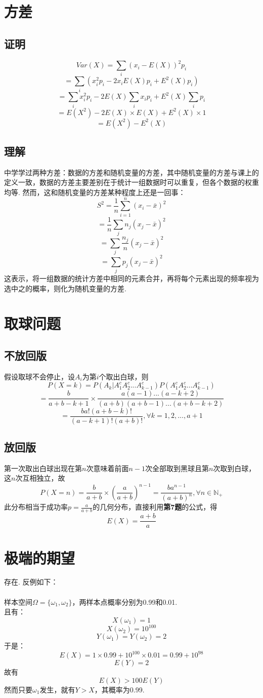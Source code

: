 \documentclass{article}
\begin{document}
\begin{CJK}{UTF8}{gbsn}
\section{方差}
\subsection{证明}
$$ Var(X)=\sum\limits_{i}(x_{i}-E(X))^{2}p_{i}$$
$$ =\sum\limits_{i}(x_{i}^{2}p_{i}-2x_{i}E(X)p_{i}+E^{2}(X)p_{i}) $$
$$ =\sum\limits_{i}x_{i}^{2}p_{i}-2E(X)\sum\limits_{i}x_{i}p_{i}+E^{2}(X)\sum\limits_{i}p_{i} $$
$$ =E(X^{2})-2E(X)\times E(X)+E^{2}(X)\times 1 $$
$$ =E(X^{2})-E^{2}(X) $$
\subsection{理解}
中学学过两种方差：数据的方差和随机变量的方差，其中随机变量的方差与课上的定义一致，数据的方差主要差别在于统计一组数据时可以重复，但各个数据的权重均等. 然而，这和随机变量的方差某种程度上还是一回事：
$$ S^{2}=\frac{1}{n}\sum\limits_{i=1}^{n}(x_{i}-\bar{x})^{2} $$
$$ =\frac{1}{n}\sum\limits_{j}n_{j}(x_{j}-\bar{x})^{2} $$
$$ =\sum\limits_{j}\frac{n_{j}}{n}(x_{j}-\bar{x})^{2} $$
$$ =\sum\limits_{j}p_{j}(x_{j}-\bar{x})^{2} $$
这表示，将一组数据的统计方差中相同的元素合并，再将每个元素出现的频率视为选中之的概率，则化为随机变量的方差.
\section{取球问题}
\subsection{不放回版}
假设取球不会停止，设$A_{i}$为第$i$个取出白球，则\\
$$P(X=k)=P(A_{k}|A_{1}^{c}A_{2}^{c}...A_{k-1}^{c})P(A_{1}^{c}A_{2}^{c}...A_{k-1}^{c})$$
$$=\frac{b}{a+b-k+1}\times\frac{a(a-1)...(a-k+2)}{(a+b)(a+b-1)...(a+b-k+2)}$$
$$=\frac{ba!(a+b-k)!}{(a-k+1)!(a+b)!},\forall k=1,2,...,a+1$$
\subsection{放回版}
第一次取出白球出现在第$n$次意味着前面$n-1$次全部取到黑球且第$n$次取到白球，这$n$次互相独立，故
$$P(X=n)=\frac{b}{a+b}\times(\frac{a}{a+b})^{n-1}=\frac{ba^{n-1}}{(a+b)^{n}},\forall n\in\mathbb{N}_{+} $$
此分布相当于成功率$p=\frac{a}{a+b}$的几何分布，直接利用\textbf{第7题}的公式，得
$$ E(X)=\frac{a+b}{a} $$
\section{极端的期望}
存在. 反例如下：
\\\\
样本空间$\Omega=\{\omega_{1},\omega_{2}\}$，两样本点概率分别为0.99和0.01.
\\且有：
$$ X(\omega_{1})=1 $$
$$ X(\omega_{2})=10^{100} $$
$$ Y(\omega_{1})=Y(\omega_{2})=2 $$
于是：
$$ E(X)=1\times 0.99+10^{100}\times 0.01=0.99+10^{98} $$
$$ E(Y)=2 $$
故有
$$ E(X)>100E(Y) $$
然而只要$\omega_{1}$发生，就有$Y>X$，其概率为0.99.

\end{CJK}
\end{document}
